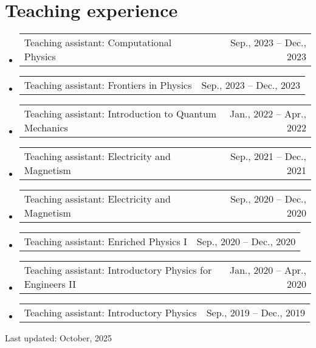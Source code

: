 \documentclass[letterpaper,11pt]{article}
\makeatletter
\newcommand{\TeachingItem}[2]{
	\item{\vspace{-1pt}
		\begin{tabular*}{0.92\textwidth}{l@{\extracolsep{\fill}}r}
			{#1} & {#2}
		\end{tabular*}
		\vspace{-5pt}
	}
}
\newcommand{\SkillsItem}[2]{
	\item{\vspace{-1pt}
		\begin{tabular*}{0.97\textwidth}{l l}
			{#1:} & {#2}
		\end{tabular*}
		\vspace{-5pt}
	}
}
\makeatother
\begin{document}

\section*{Teaching experience}
\begin{itemize}[leftmargin=*]
	\TeachingItem{Teaching assistant: Computational Physics}{Sep., 2023 -- Dec., 2023}
	\TeachingItem{Teaching assistant: Frontiers in Physics}{Sep., 2023 -- Dec., 2023}
	\TeachingItem{Teaching assistant: Introduction to Quantum Mechanics}{Jan., 2022 -- Apr., 2022}
	\TeachingItem{Teaching assistant: Electricity and Magnetism}{Sep., 2021 -- Dec., 2021}
	\TeachingItem{Teaching assistant: Electricity and Magnetism}{Sep., 2020 -- Dec., 2020}
	\TeachingItem{Teaching assistant: Enriched Physics I}{Sep., 2020 -- Dec., 2020}
	\TeachingItem{Teaching assistant: Introductory Physics for Engineers II}{Jan., 2020 -- Apr., 2020}
	\TeachingItem{Teaching assistant: Introductory Physics}{Sep., 2019 -- Dec., 2019}
\end{itemize}

\vspace{1cm}

\begin{flushright}
	Last updated: October, 2025
\end{flushright}
\end{document}
